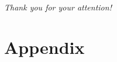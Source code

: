 \documentclass[10pt]{beamer}
\begin{document}
\appendix

	\begin{frame}{}
	\label{frame:thankyouslide}
		\vfill
	  \centering 
	  {\Huge\color{red} 
	  \emph{Thank you for your attention!}}
		\vfill
		\centering
	\end{frame}

\section{Appendix}

\begin{frame}

\end{frame}

\begin{frame}

\end{frame}
\end{document}
